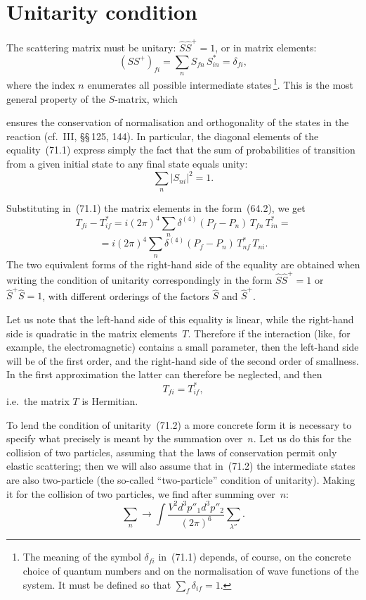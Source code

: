 \section{Unitarity condition}

The scattering matrix must be unitary: $\hat{S}\hat{S}^+ = 1$, or in matrix elements:
\begin{equation}
(SS^+)_{fi} = \sum_n S_{fn}\,S^*_{in} = \delta_{fi},
\tag{71.1}
\end{equation}
where the index $n$ enumerates all possible intermediate states\,\footnote{The meaning of the symbol $\delta_{fi}$ in~(71.1) depends, of course, on the concrete choice of quantum numbers and on the normalisation of wave functions of the system. It must be defined so that $\sum_f \delta_{if} = 1$.}. This is the most general property of the $S$-matrix, which

ensures the conservation of normalisation and orthogonality of the states in the reaction (cf.~III, \S\S\,125, 144). In particular, the diagonal elements of the equality~(71.1) express simply the fact that the sum of probabilities of transition from a given initial state to any final state equals unity:
\[
\sum_n|S_{ni}|^2 = 1.
\]

Substituting in~(71.1) the matrix elements in the form~(64.2), we get
\[
T_{fi} - T^*_{if} = i(2\pi)^4\sum_n\delta^{(4)}(P_f - P_n)\,T_{fn}\,T^*_{in} =
\]
\begin{equation}
= i(2\pi)^4\sum_n\delta^{(4)}(P_f - P_n)\,T^*_{nf}\,T_{ni}.
\tag{71.2}
\end{equation}
The two equivalent forms of the right-hand side of the equality are obtained when writing the condition of unitarity correspondingly in the form $\hat{S}\hat{S}^+ = 1$ or $\hat{S}^+\hat{S} = 1$, with different orderings of the factors $\hat{S}$ and $\hat{S}^+$.

Let us note that the left-hand side of this equality is linear, while the right-hand side is quadratic in the matrix elements~$T$. Therefore if the interaction (like, for example, the electromagnetic) contains a small parameter, then the left-hand side will be of the first order, and the right-hand side of the second order of smallness. In the first approximation the latter can therefore be neglected, and then
\begin{equation}
T_{fi} = T^*_{if},
\tag{71.3}
\end{equation}
i.e.\ the matrix $T$ is Hermitian.

To lend the condition of unitarity~(71.2) a more concrete form it is necessary to specify what precisely is meant by the summation over~$n$. Let us do this for the collision of two particles, assuming that the laws of conservation permit only elastic scattering; then we will also assume that in~(71.2) the intermediate states are also two-particle (the so-called ``two-particle'' condition of unitarity). Making it for the collision of two particles, we find after summing over~$n$:
\[
\sum_n \to \int\frac{V^2 d^3p''_1 d^3p''_2}{(2\pi)^6}\sum_{\lambda''}.
\]

